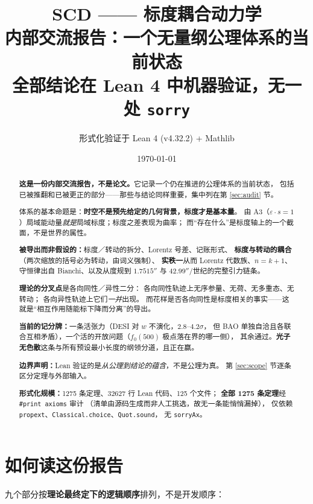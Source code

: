 \documentclass[11pt,a4paper]{article}
\title{\textbf{SCD —— 标度耦合动力学}\\[6pt]
\large 内部交流报告：一个无量纲公理体系的当前状态\\[2pt]
\normalsize 全部结论在 Lean 4 中机器验证，无一处 \texttt{sorry}}
\author{形式化验证于 Lean 4 (v4.32.2) + Mathlib}
\date{\today}
\theoremstyle{sudef}
\begin{document}
\maketitle

\begin{abstract}
\noindent
\textbf{这是一份内部交流报告，不是论文。}它记录一个仍在推进的公理体系的当前状态，
包括已被推翻和已被更正的部分——那些与结论同样重要，集中列在第 \ref{sec:audit} 节。

体系的基本命题是：\textbf{时空不是预先给定的几何背景，标度才是基本量}。
由 A3（$\varepsilon\cdot s=1$）局域能动量\emph{就是}局域标度；标度之差表现为曲率；
而“存在什么”是标度轴上的一个截面，不是世界的属性。

\medskip
\noindent\textbf{被导出而非假设的：}标度／转动的拆分、Lorentz 号差、记账形式、
\textbf{标度与转动的耦合}（两次缩放的括号必为转动，由词义强制）、
\textbf{实秩一}从而 Lorentz 代数族、$n=k+1$、
守恒律出自 Bianchi、以及从度规到 $1.7515''$ 与 $42.99''/$世纪的完整引力链条。

\medskip
\noindent\textbf{理论的分叉点}是各向同性／异性二分：
各向同性轨迹上无序参量、无荷、无多重态、无转动；
各向异性轨迹上它们\emph{一并}出现。
而花样是否各向同性是标度相关的事实——这就是“相互作用随能标下降而分离”的导出。

\medskip
\noindent\textbf{当前的记分牌：}一条活张力（DESI 对 $w$ 不演化，$2.8$--$4.2\sigma$，
但 BAO 单独自洽且各联合互相矛盾），一个活的开放问题（$f_0(500)$ 极点落在界的哪一侧），
其余通过。\textbf{光子无色散}这条与所有预设最小长度的纲领分道，且正在赢。

\medskip
\noindent\textbf{边界声明：}Lean 验证的是\emph{从公理到结论的蕴含}，不是公理为真。
第 \ref{sec:scope} 节逐条区分定理与外部输入。

\medskip
\noindent\textbf{形式化规模：}1275 条定理、32627 行 Lean 代码、125 个文件；
\textbf{全部 1275 条定理}经 \texttt{\#print axioms} 审计
（清单由源码生成而非人工挑选，故无一条能悄悄漏掉），
仅依赖 \texttt{propext}、\texttt{Classical.choice}、\texttt{Quot.sound}，
无 \texttt{sorryAx}。
\end{abstract}

\section*{如何读这份报告}

九个部分按\textbf{理论最终定下的逻辑顺序}排列，不是开发顺序：
\end{document}
